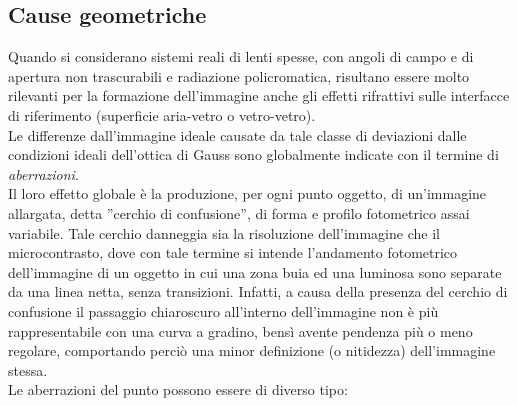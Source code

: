 \subsection {Cause geometriche}

Quando si considerano sistemi reali di lenti spesse, con angoli di campo e di apertura non trascurabili e radiazione policromatica, risultano essere molto rilevanti per la formazione dell'immagine anche gli effetti rifrattivi sulle interfacce di riferimento (superficie aria-vetro o vetro-vetro). \\
Le differenze dall'immagine ideale causate da tale classe di deviazioni dalle condizioni ideali dell'ottica di Gauss sono globalmente indicate con il termine di \textit{aberrazioni}. \\
Il loro effetto globale è la produzione, per ogni punto oggetto, di un'immagine allargata, detta ''cerchio di confusione'', di forma e profilo fotometrico assai variabile. Tale cerchio danneggia sia la risoluzione dell'immagine che il microcontrasto, dove con tale termine si intende l'andamento fotometrico dell'immagine di un oggetto in cui una zona buia ed una luminosa sono separate da una linea netta, senza transizioni. Infatti, a causa della presenza del cerchio di confusione il passaggio chiaroscuro all'interno dell'immagine non è più rappresentabile con una curva a gradino, bensì avente pendenza più o meno regolare, comportando perciò una minor definizione (o nitidezza) dell'immagine stessa. \\
Le aberrazioni del punto possono essere di diverso tipo:

